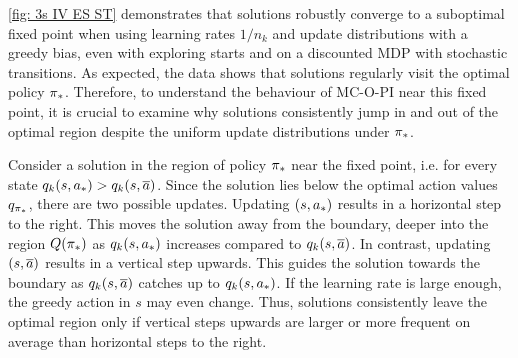 




\autoref{fig: 3s IV ES ST} demonstrates that solutions robustly converge to a suboptimal fixed point
when using learning rates $1/n_k$ and update distributions with a greedy bias, even with exploring starts and on a discounted MDP with stochastic transitions.
As expected, the data shows that solutions regularly visit the optimal policy ${\pi}_*$. 
Therefore, to understand the behaviour of MC-O-PI near this fixed point, it is crucial to examine why solutions consistently jump in and out of the optimal region
despite the uniform update distributions under ${\pi}_*$.


Consider a solution in the region of policy ${\pi}_*$ near the fixed point, i.e. for every state $q_k(s, {a}_*) > q_k(s, \overline{a})$.
Since the solution lies below the optimal action values $q_{{\pi}_*}$, there are two possible updates.
Updating $(s, {a}_*)$ results in a horizontal step to the right. This moves the solution away from the boundary, deeper into the region $Q({\pi}_*)$ as $q_k(s, {a}_*)$ increases compared to $q_k(s, \overline{a})$.
In contrast, updating $(s, \overline{a})$ results in a vertical step upwards. This guides the solution towards the boundary as $q_k(s, \overline{a})$ catches up to $q_k(s, {a}_*)$. If the learning rate is large enough, the greedy action in $s$ may even change.
Thus, solutions consistently leave the optimal region only if vertical steps upwards are larger or more frequent on average than horizontal steps to the right.


